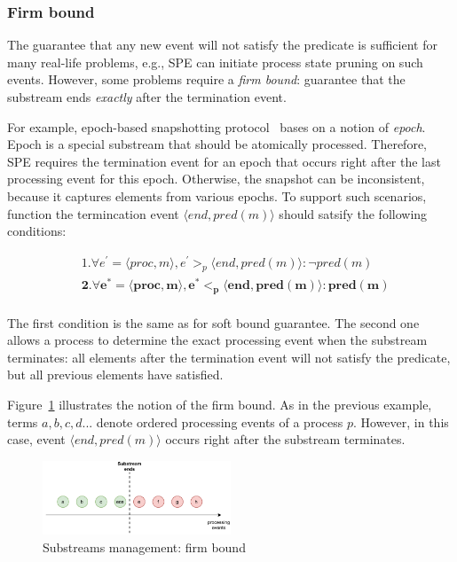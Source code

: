 \subsubsection{Firm bound}

The guarantee that any new event will not satisfy the predicate is sufficient for many real-life problems, e.g., SPE can initiate process state pruning on such events. However, some problems require a {\em firm bound}: guarantee that the substream ends {\em exactly} after the termination event. 

For example, epoch-based snapshotting protocol~\cite{2015arXiv150608603C, jacques2016consistent} bases on a notion of {\em epoch}. Epoch is a special substream that should be atomically processed. Therefore, SPE requires the termination event for an epoch that occurs right after the last processing event for this epoch. Otherwise, the snapshot can be inconsistent, because it captures elements from various epochs. To support such scenarios, function the termincation event $\langle end, pred(m)\rangle$ should satsify the following conditions:

\begin{align*}
&1. \forall e^{'} = \langle proc,m\rangle, e^{'} >_p \langle end,pred(m)\rangle : \neg pred(m) \\
&\boldsymbol{2. \forall e^{*} = \langle proc,m\rangle, e^{*} <_p \langle end,pred(m)\rangle : pred(m)} \\
\end{align*}

The first condition is the same as for soft bound guarantee. The second one allows a process to determine the exact processing event when the substream terminates: all elements after the termination event will not satisfy the predicate, but all previous elements have satisfied. 

Figure~\ref{strict_guarantees} illustrates the notion of the firm bound. As in the previous example, terms $a,b,c,d...$ denote ordered processing events of a process $p$. However, in this case, event $\langle end, pred(m)\rangle$ occurs right after the substream terminates.

\begin{figure}[htbp]
  \centering
  \includegraphics[width=0.50\textwidth]{pics/strict-guarantee.pdf}
  \caption{Substreams management: firm bound}
  \label{strict_guarantees}
\end{figure}

